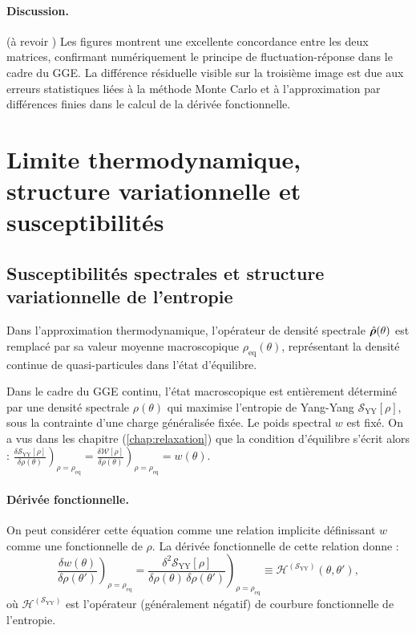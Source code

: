\paragraph{Discussion.}

{\color{blue} { (\color{red}à revoir )} Les figures montrent une excellente concordance entre les deux matrices, confirmant numériquement le principe de fluctuation-réponse dans le cadre du GGE. La différence résiduelle visible sur la troisième image est due aux erreurs statistiques liées à la méthode Monte Carlo et à l’approximation par différences finies dans le calcul de la dérivée fonctionnelle.} 





\section{Limite thermodynamique, structure variationnelle et susceptibilités}

\subsection{Susceptibilités spectrales et structure variationnelle de l’entropie}

Dans l’approximation thermodynamique, l’opérateur de densité spectrale $\hat{\bm{\rho}}(\theta)$ est remplacé par sa valeur moyenne macroscopique $\rho_{\mathrm{eq}}(\theta)$, représentant la densité continue de quasi-particules dans l’état d’équilibre.

Dans le cadre du GGE continu, l’état macroscopique est entièrement déterminé par une densité spectrale $\rho(\theta)$ qui maximise l’entropie de Yang-Yang $\mathcal{S}_{\mathrm{YY}}[\rho]$, sous la contrainte d’une charge généralisée fixée. Le poids spectral $w$ est fixé. On a vus dans les chapitre (\ref{chap:relaxation}) que la condition d’équilibre s’écrit alors :
\(
\left. \frac{\delta \mathcal{S}_{\mathrm{YY}}[\rho]}{\delta \rho(\theta)} \right)_{\rho = \rho_{\mathrm{eq}}} = \left. \frac{\delta \mathcal{W}[\rho]}{\delta \rho(\theta)} \right)_{\rho = \rho_{\mathrm{eq}}} =  w(\theta).
\)

\medskip
\paragraph{Dérivée fonctionnelle.}
On peut considérer cette équation comme une relation implicite définissant $w$ comme une fonctionnelle de $\rho$. La dérivée fonctionnelle de cette relation donne :
\[
\left.\frac{\delta w(\theta)}{\delta \rho(\theta')}\right)_{\rho = \rho_{\mathrm{eq}}} = \left. \frac{\delta^2 \mathcal{S}_{\mathrm{YY}}[\rho]}{\delta \rho(\theta)\, \delta \rho(\theta')} \right)_{\rho = \rho_{\mathrm{eq}}} \equiv \mathcal{H}^{(\mathcal{S}_{\mathrm{YY}})}(\theta, \theta'),
\]
où $\mathcal{H}^{(\mathcal{S}_{\mathrm{YY}})}$ est l'opérateur (généralement négatif) de courbure fonctionnelle de l'entropie.

